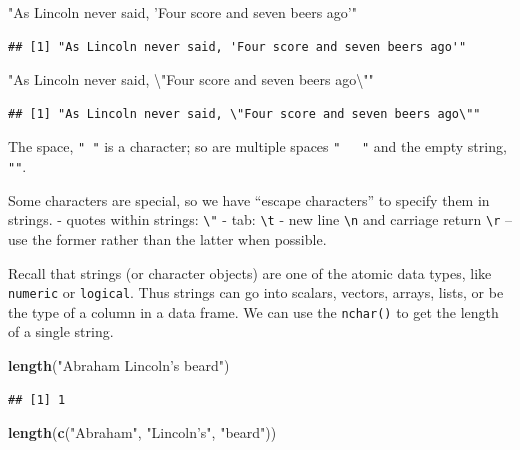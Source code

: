 \documentclass[
]{book}
\newenvironment{Shaded}{\begin{snugshade}}{\end{snugshade}}
\newcommand{\CharTok}[1]{\textcolor[rgb]{0.31,0.60,0.02}{#1}}
\newcommand{\KeywordTok}[1]{\textcolor[rgb]{0.13,0.29,0.53}{\textbf{#1}}}
\newcommand{\NormalTok}[1]{#1}
\newcommand{\StringTok}[1]{\textcolor[rgb]{0.31,0.60,0.02}{#1}}
\begin{document}
\begin{Shaded}
\begin{Highlighting}[]
\StringTok{"As Lincoln never said, 'Four score and seven beers ago'"}
\end{Highlighting}
\end{Shaded}

\begin{verbatim}
## [1] "As Lincoln never said, 'Four score and seven beers ago'"
\end{verbatim}

\begin{Shaded}
\begin{Highlighting}[]
\StringTok{"As Lincoln never said, }\CharTok{\textbackslash{}"}\StringTok{Four score and seven beers ago}\CharTok{\textbackslash{}"}\StringTok{"}
\end{Highlighting}
\end{Shaded}

\begin{verbatim}
## [1] "As Lincoln never said, \"Four score and seven beers ago\""
\end{verbatim}

The space, \texttt{"\ "} is a character; so are multiple spaces \texttt{"\ \ \ "} and the empty string, \texttt{""}.

Some characters are special, so we have ``escape characters'' to specify them in strings.
- quotes within strings: \texttt{\textbackslash{}"}
- tab: \texttt{\textbackslash{}t}
- new line \texttt{\textbackslash{}n} and carriage return \texttt{\textbackslash{}r} -- use the former rather than the latter when possible.

Recall that strings (or character objects) are one of the atomic data types, like \texttt{numeric} or \texttt{logical}. Thus strings can go into scalars, vectors, arrays, lists, or be the type of a column in a data frame. We can use the \texttt{nchar()} to get the length of a single string.

\begin{Shaded}
\begin{Highlighting}[]
\KeywordTok{length}\NormalTok{(}\StringTok{"Abraham Lincoln's beard"}\NormalTok{)}
\end{Highlighting}
\end{Shaded}

\begin{verbatim}
## [1] 1
\end{verbatim}

\begin{Shaded}
\begin{Highlighting}[]
\KeywordTok{length}\NormalTok{(}\KeywordTok{c}\NormalTok{(}\StringTok{"Abraham"}\NormalTok{, }\StringTok{"Lincoln's"}\NormalTok{, }\StringTok{"beard"}\NormalTok{))}
\end{Highlighting}
\end{Shaded}
\end{document}
